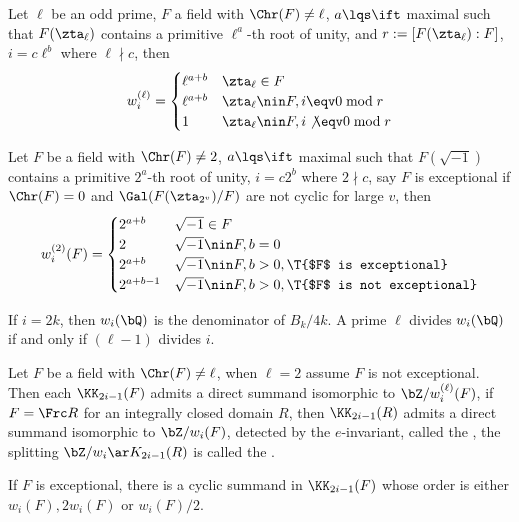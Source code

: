 \documentclass[article, a4paper, twoside]{universal}
\begin{document}
\begin{thm}
    Let $\ell$ be an odd prime, $F$ a field with $\Chr(F)\neq\ell$, $a\lqs\ift$ maximal such that $F(\zta_{\ell})$ contains a primitive $\ell^{a}$-th root of unity, and $r:=[F(\zta_{\ell}):F]$, $i=c\ell^{b}$ where $\ell\nmid c$, then
    \[
        w_{i}^{(\ell)}=\begin{cases}
            \ell^{a+b} & \zta_{\ell}\in F \\
            \ell^{a+b} & \zta_{\ell}\nin F, i\eqv 0\bmod r \\
            1 & \zta_{\ell}\nin F, i\not\eqv 0\bmod r
        \end{cases}
    \]

    Let $F$ be a field with $\Chr(F)\neq2$, $a\lqs\ift$ maximal such that $F(\sqrt{-1})$ contains a primitive $2^{a}$-th root of unity, $i=c2^{b}$ where $2\nmid c$, say $F$ is exceptional if $\Chr(F)=0$ and $\Gal(F(\zta_{2^{v}})/F)$ are not cyclic for large $v$, then
    \[
        w_{i}^{(2)}(F)=\begin{cases}
          2^{a+b} & \sqrt{-1}\in F \\
          2 & \sqrt{-1}\nin F, b=0 \\
          2^{a+b} & \sqrt{-1}\nin F, b>0, \T{$F$ is exceptional} \\
          2^{a+b-1} & \sqrt{-1}\nin F, b>0, \T{$F$ is not exceptional}
        \end{cases}
    \]

    If $i=2k$, then $w_{i}(\bQ)$ is the denominator of $B_{k}/4k$. A prime $\ell$ divides $w_{i}(\bQ)$ if and only if $(\ell-1)$ divides $i$.
\end{thm}

\begin{thm}
    Let $F$ be a field with $\Chr(F)\neq\ell$, when $\ell=2$ assume $F$ is not exceptional. Then each $\KK_{2i-1}(F)$ admits a direct summand isomorphic to $\bZ/w_{i}^{(\ell)}(F)$, if $F=\Frc R$ for an integrally closed domain $R$, then $\KK_{2i-1}(R)$ admits a direct summand isomorphic to $\bZ/w_{i}(F)$, detected by the $e$-invariant, called the , the splitting $\bZ/w_{i}\ar K_{2i-1}(R)$ is called the .

    If $F$ is exceptional, there is a cyclic summand in $\KK_{2i-1}(F)$ whose order is either $w_{i}(F),2w_{i}(F)$ or $w_{i}(F)/2$.
\end{thm}
\end{document}
